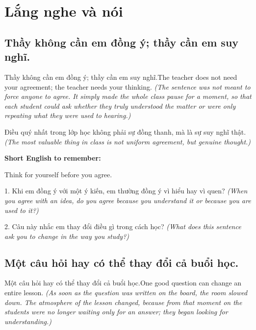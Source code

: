 \chapter{Lắng nghe và nói}


\section{Thầy không cần em đồng ý; thầy cần em suy nghĩ.}
\begin{truyen}{Thầy không cần em đồng ý; thầy cần em suy nghĩ.}{The teacher does not need your agreement; the teacher needs your thinking.}
\textit{(The sentence was not meant to force anyone to agree. It simply made the whole class pause for a moment, so that each student could ask whether they truly understood the matter or were only repeating what they were used to hearing.)}
\end{truyen}

\begin{baihoc}
Điều quý nhất trong lớp học không phải sự đồng thanh, mà là sự suy nghĩ thật.
\textit{(The most valuable thing in class is not uniform agreement, but genuine thought.)}
\end{baihoc}

\begin{ghinhoanh}
\textbf{Short English to remember:}

Think for yourself before you agree.

\end{ghinhoanh}

\begin{tuhocnhanh}
1. Khi em đồng ý với một ý kiến, em thường đồng ý vì hiểu hay vì quen? \textit{(When you agree with an idea, do you agree because you understand it or because you are used to it?)}

2. Câu này nhắc em thay đổi điều gì trong cách học? \textit{(What does this sentence ask you to change in the way you study?)}
\end{tuhocnhanh}
\ngancach


\section{Một câu hỏi hay có thể thay đổi cả buổi học.}
\begin{truyen}{Một câu hỏi hay có thể thay đổi cả buổi học.}{One good question can change an entire lesson.}
\textit{(As soon as the question was written on the board, the room slowed down. The atmosphere of the lesson changed, because from that moment on the students were no longer waiting only for an answer; they began looking for understanding.)}
\end{truyen}

